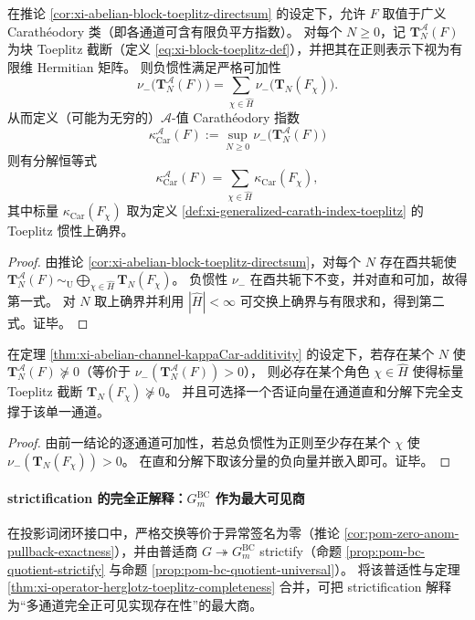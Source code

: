 \begin{theorem}\label{thm:xi-abelian-channel-kappaCar-additivity}
在推论 \ref{cor:xi-abelian-block-toeplitz-directsum} 的设定下，允许 \(F\) 取值于广义 Carath\'eodory 类（即各通道可含有限负平方指数）。
对每个 \(N\ge 0\)，记 \(\mathbf{T}^{\mathcal{A}}_N(F)\) 为块 Toeplitz 截断（定义 \eqref{eq:xi-block-toeplitz-def}），并把其在正则表示下视为有限维 Hermitian 矩阵。
则负惯性满足严格可加性
\[
\boxed{\;
\nu_-\!\bigl(\mathbf{T}^{\mathcal{A}}_N(F)\bigr)
=\sum_{\chi\in\widehat H}\nu_-\!\bigl(\mathbf{T}_N(F_\chi)\bigr).\;}
\]
从而定义（可能为无穷的）\(\mathcal{A}\)-值 Carath\'eodory 指数
\[
\kappa_{\mathrm{Car}}^{\mathcal{A}}(F):=\sup_{N\ge 0}\nu_-\!\bigl(\mathbf{T}^{\mathcal{A}}_N(F)\bigr)
\]
则有分解恒等式
\[
\boxed{\;
\kappa_{\mathrm{Car}}^{\mathcal{A}}(F)
=\sum_{\chi\in\widehat H}\kappa_{\mathrm{Car}}(F_\chi),\;}
\]
其中标量 \(\kappa_{\mathrm{Car}}(F_\chi)\) 取为定义 \ref{def:xi-generalized-carath-index-toeplitz} 的 Toeplitz 惯性上确界。
\end{theorem}
\begin{proof}
由推论 \ref{cor:xi-abelian-block-toeplitz-directsum}，对每个 \(N\) 存在酉共轭使
\(
\mathbf{T}^{\mathcal{A}}_N(F)\sim_{\mathrm U}\bigoplus_{\chi\in\widehat H}\mathbf{T}_N(F_\chi)
\)。
负惯性 \(\nu_-\) 在酉共轭下不变，并对直和可加，故得第一式。
对 \(N\) 取上确界并利用 \(|\widehat H|<\infty\) 可交换上确界与有限求和，得到第二式。证毕。
\end{proof}

\begin{corollary}[负性证书的单通道局域化]\label{cor:xi-abelian-channel-negativity-localization}
在定理 \ref{thm:xi-abelian-channel-kappaCar-additivity} 的设定下，若存在某个 \(N\) 使 \(\mathbf{T}^{\mathcal{A}}_N(F)\nsucceq 0\)（等价于 \(\nu_-(\mathbf{T}^{\mathcal{A}}_N(F))>0\)），
则必存在某个角色 \(\chi\in\widehat H\) 使得标量 Toeplitz 截断 \(\mathbf{T}_N(F_\chi)\nsucceq 0\)。
并且可选择一个否证向量在通道直和分解下完全支撑于该单一通道。
\end{corollary}
\begin{proof}
由前一结论的逐通道可加性，若总负惯性为正则至少存在某个 \(\chi\) 使 \(\nu_-(\mathbf{T}_N(F_\chi))>0\)。
在直和分解下取该分量的负向量并嵌入即可。证毕。
\end{proof}

\paragraph{strictification 的完全正解释：\texorpdfstring{$G^{\mathrm{BC}}_m$}{GBCm} 作为最大可见商}
在投影词闭环接口中，严格交换等价于异常签名为零（推论 \ref{cor:pom-zero-anom-pullback-exactness}），并由普适商 \(G\twoheadrightarrow G^{\mathrm{BC}}_m\) strictify（命题 \ref{prop:pom-bc-quotient-strictify} 与命题 \ref{prop:pom-bc-quotient-universal}）。
将该普适性与定理 \ref{thm:xi-operator-herglotz-toeplitz-completeness} 合并，可把 strictification 解释为“多通道完全正可见实现存在性”的最大商。

